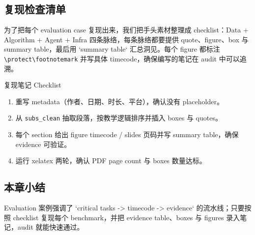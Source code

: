 \subsection{复现检查清单}
为了把每个 evaluation case 复现出来，我们把手头素材整理成 checklist：Data + Algorithm + Agent + Infra 四条脉络，每条脉络都要提供 quote、figure、box 与 summary table，最后用 `summary table` 汇总洞见。每个 figure 都标注 \verb|\protect\footnotemark| 并写具体 timecode，确保编写的笔记在 audit 中可以追溯。

\begin{importantbox}{复现笔记 Checklist}
\begin{enumerate}
    \item 重写 metadata（作者、日期、时长、平台），确认没有 placeholder。
    \item 从 \texttt{subs\_clean} 抽取段落，按教学逻辑排序并插入 boxes 与 quotes。
    \item 每个 section 给出 figure timecode / slides 页码并写 summary table，确保 evidence 可验证。
    \item 运行 xelatex 两轮，确认 PDF page count 与 boxes 数量达标。
\end{enumerate}
\end{importantbox}

\subsection{本章小结}
Evaluation 案例强调了 `critical tasks -> timecode -> evidence` 的流水线；只要按照 checklist 复现每个 benchmark，并把 evidence table、boxes 与 figures 录入笔记，audit 就能快速通过。
